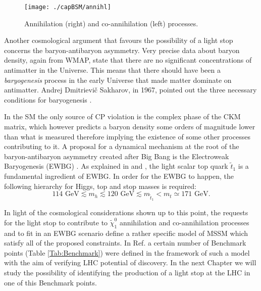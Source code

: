 \begin{figure}[htb]\begin{center}
\texttt{[image: ./capBSM/annihl]}\caption{Annihilation (right) and co-annihilation (left) processes.}
\label{annihil}\end{center}\end{figure}

Another cosmological argument that favours the possibility of a light stop concerns the baryon-antibaryon asymmetry. Very precise data about baryon density, again from WMAP, state that there are no significant concentrations of antimatter in the Universe. This means that there should have been a \textit{baryogenesis} process in the early Universe that made matter dominate on antimatter. Andrej Dmitrievi\v{c} Sakharov, in 1967, pointed out the three necessary conditions for baryogenesis \cite{Sakharov}.

In the SM the only source of CP violation is the complex phase of the CKM matrix, which however predicts a baryon density some orders of magnitude lower than what is measured therefore implying the existence of some other processes contributing to it. A proposal for a dynamical mechanism at the root of the baryon-antibaryon asymmetry created after Big Bang is the Electroweak Baryogenesis (EWBG) \cite{Huet}. As explained in \cite{Huet} and \cite{Balazs}, the light scalar top quark $\tilde{t}_{1}$ is a fundamental ingredient of EWBG. In order for the EWBG to happen, the following hierarchy for Higgs, top and stop masses is required:\begin{equation}\label{eq:ewbgMass} 114 \mbox{ GeV} \lesssim m_{h} \lesssim 120 \mbox{ GeV} \lesssim m_{\tilde{t}_{1}} < m_{t} \simeq 171  \mbox{ GeV}.\end{equation} 

In light of the cosmological considerations shown up to this point, the requests for the light stop to contribute to $\tilde\chi^0_1$ annihilation and co-annihilation processes and to fit in an EWBG scenario define a rather specific model of MSSM which satisfy all of the proposed constraints. In Ref. \cite{Balazs} a certain number of Benchmark points (Table \ref{Tab:Benchmark}) were defined in the framework of such a model with the aim of verifying LHC potential of discovery. In the next Chapter we will study the possibility of identifying the production of a light stop at the LHC in one of this Benchmark points.




